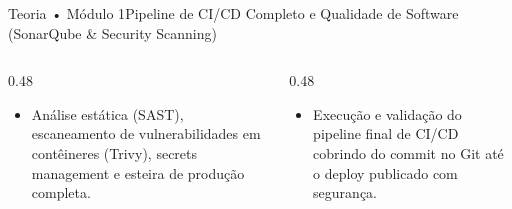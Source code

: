 \begin{senaiframe}{Teoria • Módulo 1}{Pipeline de CI/CD Completo e Qualidade de Software (SonarQube & Security Scanning)}
  \begin{columns}[t]
    \begin{column}{0.48\textwidth}
      \begin{tcolorbox}[senaibluecard, title={Fundamentos Teóricos}]
        \begin{itemize}
          \item Análise estática (SAST), escaneamento de vulnerabilidades em contêineres (Trivy), secrets management e esteira de produção completa.
        \end{itemize}
      \end{tcolorbox}
    \end{column}
    \begin{column}{0.48\textwidth}
      \begin{tcolorbox}[senaigreencard, title={Prática \& Laboratório}]
        \begin{itemize}
          \item Execução e validação do pipeline final de CI/CD cobrindo do commit no Git até o deploy publicado com segurança.
        \end{itemize}
      \end{tcolorbox}
    \end{column}
  \end{columns}
\end{senaiframe}
